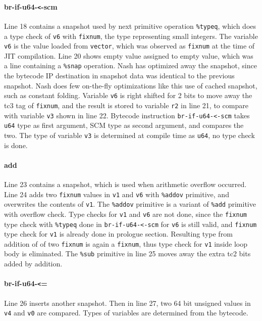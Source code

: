 \documentclass[preprint, 10pt]{sigplanconf}
\begin{document}
\paragraph{br-if-u64-\texttt{<}-scm} Line 18 contains a snapshot used by next
primitive operation \texttt{\%typeq}, which does a type check of \texttt{v6}
with \texttt{fixnum}, the type representing small integers. The variable
\texttt{v6} is the value loaded from \texttt{vector}, which was observed as
\texttt{fixnum} at the time of JIT compilation. Line 20 shows empty value
assigned to empty value, which was a line containing a \texttt{\%snap}
operation. Nash has optimized away the snapshot, since the bytecode IP
destination in snapshot data was identical to the previous snapshot. Nash does
few on-the-fly optimizations like this use of cached snapshot, such as constant
folding.  Variable \texttt{v6} is right shifted for 2 bits to move away the tc3
tag of \texttt{fixnum}, and the result is stored to variable \texttt{r2} in line
21, to compare with variable \texttt{v3} shown in line 22. Bytecode instruction
\texttt{br-if-u64-<-scm} takes \texttt{u64} type as first argument, SCM type as
second argument, and compares the two. The type of variable \texttt{v3} is
determined at compile time as \texttt{u64}, no type check is done.

\paragraph{add} Line 23 contains a snapshot, which is used
when arithmetic overflow occurred. Line 24 adds two \texttt{fixnum} values in
\texttt{v1} and \texttt{v6} with \texttt{\%addov} primitive, and overwrites the
contents of \texttt{v1}. The \texttt{\%addov} primitive is a variant of
\texttt{\%add} primitive with overflow check. Type checks for \texttt{v1} and
\texttt{v6} are not done, since the \texttt{fixnum} type check with
\texttt{\%typeq} done in \texttt{br-if-u64-<-scm} for \texttt{v6} is still
valid, and \texttt{fixnum} type check for \texttt{v1} is already done in
prologue section. Resulting type from addition of of two \texttt{fixnum} is
again a \texttt{fixnum}, thus type check for \texttt{v1} inside loop body is
eliminated. The \texttt{\%sub} primitive in line 25 moves away the extra tc2
bits added by addition.

\paragraph{br-if-u64-\texttt{<}=} Line 26 inserts another snapshot. Then in line
27, two 64 bit unsigned values in \texttt{v4} and \texttt{v0} are
compared. Types of variables are determined from the bytecode.
\end{document}
